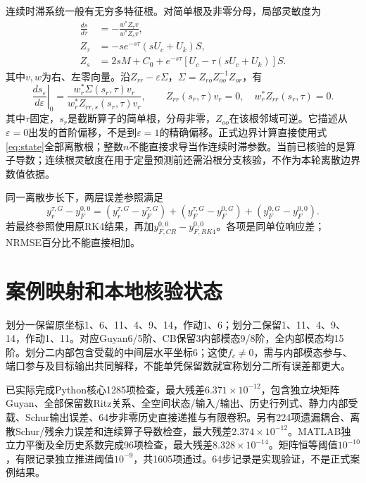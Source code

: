 \documentclass[UTF8,11pt,a4paper]{ctexart}
\begin{document}
连续时滞系统一般有无穷多特征根。对简单根及非零分母，局部灵敏度为
\begin{align}
 \frac{ds}{d\tau}&=-\frac{w^*Z_\tau v}{w^*Z_sv},\label{eq:delayderivative}\\
 Z_\tau&=-s e^{-s\tau}(sU_c+U_k)S,\\
 Z_s&=2sM+C_0+e^{-s\tau}[U_c-\tau(sU_c+U_k)]S.
\end{align}
其中$v,w$为右、左零向量。沿$Z_{rr}-\varepsilon\Sigma$，$\Sigma=Z_{ro}Z_{oo}^{-1}Z_{or}$，有
\begin{equation}\label{eq:truncderivative}
 \left.\frac{ds_\varepsilon}{d\varepsilon}\right|_0=
 \frac{w_r^*\Sigma(s_r,\tau)v_r}{w_r^*Z_{rr,s}(s_r,\tau)v_r},\qquad
 Z_{rr}(s_r,\tau)v_r=0,\quad w_r^*Z_{rr}(s_r,\tau)=0.
\end{equation}
其中$\tau$固定，$s_r$是截断算子的简单根，分母非零，$Z_{oo}$在该根邻域可逆。它描述从$\varepsilon=0$出发的首阶偏移，不是到$\varepsilon=1$的精确偏移。正式边界计算直接使用式\eqref{eq:state}全部离散根；整数$n$不能直接求导当作连续时滞参数。当前已核验的是算子导数；连续根灵敏度在用于定量预测前还需沿根分支核验，不作为本轮离散边界数值依据。

同一离散步长下，两层误差参照满足
\begin{equation}\label{eq:decompose}
 y_r^{\tau,G}-y_F^{0,0}
 =(y_r^{\tau,G}-y_F^{\tau,G})
 +(y_F^{\tau,G}-y_F^{0,G})
 +(y_F^{0,G}-y_F^{0,0}).
\end{equation}
若最终参照使用原RK4结果，再加$y_{F,CR}^{0,0}-y_{F,RK4}^{0,0}$。各项是同单位响应差；NRMSE百分比不能直接相加。

\section{案例映射和本地核验状态}
划分一保留原坐标1、6、11、4、9、14，作动1、6；划分二保留1、11、4、9、14，作动1、11。对应Guyan6/5阶、CB保留3内部模态9/8阶，全内部模态均15阶。划分二内部包含受载的中间层水平坐标6；这使$f_c\ne0$，需与内部模态参与、端口参与及目标输出共同解释，不能单凭保留数就宣称划分二所有误差都更大。

已实际完成Python核心1285项检查，最大残差$6.371\times10^{-12}$，包含独立块矩阵Guyan、全部保留数Ritz关系、全空间状态/输入/输出、历史行列式、静力内部受载、Schur输出误差、64步非零历史直接递推与有限卷积。另有224项遗漏耦合、离散Schur/残余力误差和连续算子导数检查，最大残差$2.374\times10^{-12}$。MATLAB独立力平衡及全历史系数完成96项检查，最大残差$8.328\times10^{-14}$。矩阵恒等阈值$10^{-10}$，有限记录独立推进阈值$10^{-9}$，共1605项通过。64步记录是实现验证，不是正式案例结果。
\end{document}
